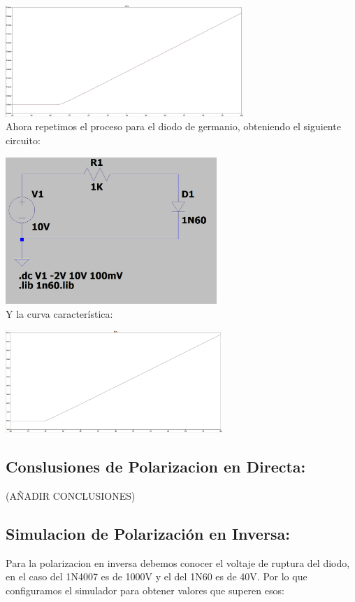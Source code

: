 \includegraphics[width=9cm]{imagenes/simulacion11.png}\\

Ahora repetimos el proceso para el diodo de germanio, obteniendo el siguiente circuito:

\includegraphics[width=8cm]{imagenes/Circuito2.png}\\

Y la curva característica:

\includegraphics[width=8.2cm]{imagenes/simulacion2.png}\\

\subsection{Conslusiones de Polarizacion en Directa:}

(AÑADIR CONCLUSIONES)

\subsection{Simulacion de Polarización en Inversa:}

Para la polarizacion en inversa debemos conocer el voltaje de ruptura del diodo, en el caso del 1N4007 es de 1000V y el del 1N60 es de 40V. Por lo que configuramos el simulador para obtener valores que superen esos:

